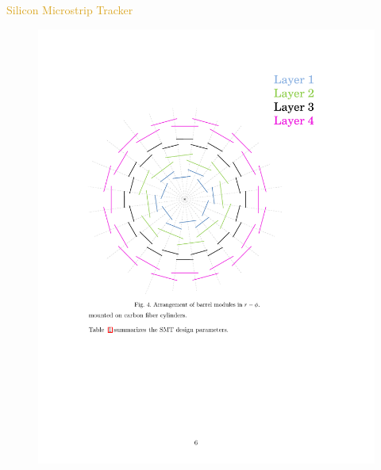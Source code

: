\begin{frame}{\textcolor{Goldenrod}{Silicon Microstrip Tracker}}
  \begin{overlayarea}{\textwidth}{\textheight}
    \begin{figure}[h]
      \centering
      \includegraphics[height=0.34\textheight]{./Images/09_SMT_01}

\end{figure}
\end{overlayarea}
\end{frame}
